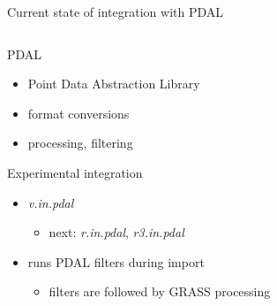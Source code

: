 \documentclass[xcolor={dvipsnames,usenames},beamer,aspectratio=43]{beamer}
\newcommand{\module}[1]{\emph{#1}}
\begin{document}
\begin{frame}{Current state of integration with PDAL}

\begin{columns}
\begin{column}{0.5\textwidth}

\begin{block}{PDAL}
 \begin{itemize}
  \item Point Data Abstraction Library
  \item format conversions
  \item processing, filtering
 \end{itemize}
\end{block}

\begin{block}{Experimental integration}
 \begin{itemize}
  \item \module{v.in.pdal}
  \begin{itemize}
    \item next: \module{r.in.pdal}, \module{r3.in.pdal}
  \end{itemize}
  \item runs PDAL filters during import
  \begin{itemize}
    \item filters are followed by GRASS processing
  \end{itemize}
 \end{itemize}
\end{block}

\end{column}
\begin{column}{0.25\textwidth}


\end{column}
\end{columns}
\end{frame}
\end{document}
